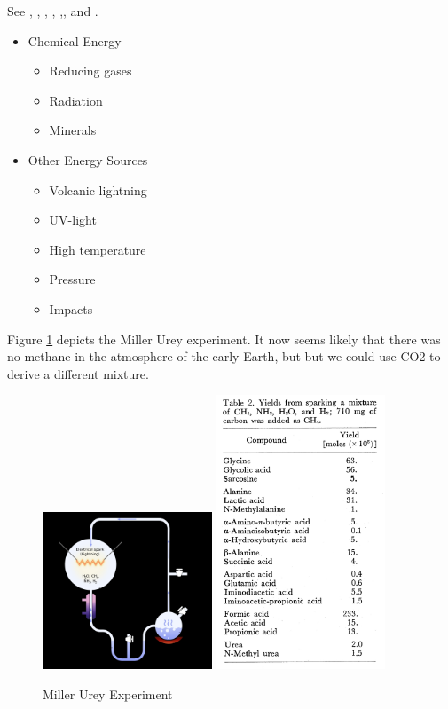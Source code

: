 \documentclass[]{article}
\begin{document}
See \cite{kitadai2018origins}, \cite{stueken2013did}, \cite{damer2016field}, \cite{miller1959organic}, \cite{ehrenfreund2002astrophysical},\cite{dalai2016incubating}, and \cite{chyba1997comets}.

\begin{itemize}
	\item Chemical Energy
	\begin{itemize}
		\item Reducing gases
		\item Radiation
		\item Minerals
	\end{itemize}
	\item Other Energy Sources
	\begin{itemize}
		\item Volcanic lightning
		\item UV-light
		\item High temperature
		\item Pressure
		\item Impacts
	\end{itemize}
\end{itemize}
Figure \ref{fig:MillerUrey} depicts the Miller Urey experiment. It now seems likely that there was no methane in the atmosphere of the early Earth, but but we could use CO2 to derive a different mixture.

\begin{figure}[H]
	\caption[Miller Urey Experiment]{Miller Urey Experiment\cite{miller1959organic}}\label{fig:MillerUrey}
	\includegraphics[width=0.45\textwidth]{MillerUrey1}
	\includegraphics[width=0.45\textwidth]{MillerUrey2}
\end{figure}
\end{document}
